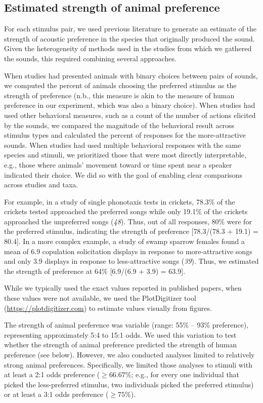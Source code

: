 \documentclass[
]{article}
\begin{document}
\subsection{Estimated strength of animal
preference}\label{estimated-strength-of-animal-preference}

For each stimulus pair, we used previous literature to generate an
estimate of the strength of acoustic preference in the species that
originally produced the sound. Given the heterogeneity of methods used
in the studies from which we gathered the sounds, this required
combining several approaches.

When studies had presented animals with binary choices between pairs of
sounds, we computed the percent of animals choosing the preferred
stimulus as the strength of preference (n.b., this measure is akin to
the measure of human preference in our experiment, which was also a
binary choice). When studies had used other behavioral measures, such as
a count of the number of actions elicited by the sounds, we compared the
magnitude of the behavioral result across stimulus types and calculated
the percent of responses for the more-attractive sounds. When studies
had used multiple behavioral responses with the same species and
stimuli, we prioritized those that were most directly interpretable,
e.g., those where animals' movement toward or time spent near a speaker
indicated their choice. We did so with the goal of enabling clear
comparisons across studies and taxa.

For example, in a study of single phonotaxis tests in crickets, 78.3\%
of the crickets tested approached the preferred songs while only 19.1\%
of the crickets approached the unpreferred songs (\emph{48}). Thus, out
of all responses, 80\% were for the preferred stimulus, indicating the
strength of preference {[}78.3/(78.3 + 19.1) = 80.4{]}. In a more
complex example, a study of swamp sparrow females found a mean of 6.9
copulation solicitation displays in response to more-attractive songs
and only 3.9 displays in response to less-attractive songs (\emph{39}).
Thus, we estimated the strength of preference at 64\% {[}6.9/(6.9 + 3.9)
= 63.9{]}.

While we typically used the exact values reported in published papers,
when these values were not available, we used the PlotDigitizer tool
(\url{https://plotdigitizer.com}) to estimate values visually from
figures.

The strength of animal preference was variable (range: 55\% -- 93\%
preference), representing approximately 5:4 to 15:1 odds. We used this
variation to test whether the strength of animal preference predicted
the strength of human preference (see below). However, we also conducted
analyses limited to relatively strong animal preferences. Specifically,
we limited those analyses to stimuli with at least a 2:1 odds preference
(\(\geq66.67\%\); e.g., for every one individual that picked the
less-preferred stimulus, two individuals picked the preferred stimulus)
or at least a 3:1 odds preference (\(\geq75\%\)).
\end{document}
